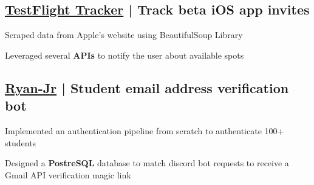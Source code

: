 





\subsection{\href{https://github.com/arian81/Testflight_Tracker}{TestFlight Tracker} | Track beta iOS app invites}
\begin{zitemize}
\item Scraped data from Apple's website using BeautifulSoup Library
\item Leveraged several \textbf{APIs} to notify the user about available spots
\end{zitemize}

\vspace{0.3cm}\subsection{\href{https://github.com/arian81/Ryan-Jr}{Ryan-Jr} | Student email address verification bot }
\begin{zitemize}
\item Implemented an authentication pipeline from scratch to authenticate 100+ students
\item Designed a \textbf{PostreSQL} database to match discord bot requests to receive a Gmail API verification magic link
\end{zitemize}